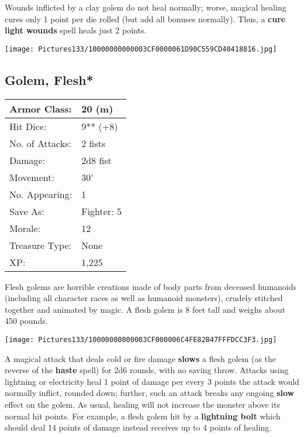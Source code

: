 \documentclass[a4paper,twoside,openany,10pt]{book}
\begin{document}
\begin{multicols}{2}
Wounds inflicted by a clay golem do not heal normally; worse, magical healing cures only 1 point per die rolled (but add all bonuses normally). Thus, a \textbf{cure light wounds }spell heals just 2 points.


\begin{center}
	\texttt{[image: Pictures133/10000000000003CF0000061D90C559CD40418816.jpg]}
\end{center}

\subsection*{Golem, Flesh*}\label{golem-flesh}

\begin{tabularx}{0.48\textwidth}{@{}lX@{}}
Armor Class: & 20 (m) \\\hline
Hit Dice: & 9** (+8) \\\hline
No. of Attacks: & 2 fists \\\hline
Damage: & 2d8 fist \\\hline
Movement: & 30' \\\hline
No. Appearing: & 1 \\\hline
Save As: & Fighter: 5 \\\hline
Morale: & 12 \\\hline
Treasure Type: & None \\\hline
XP: & 1,225 \\\hline
\end{tabularx}\medskip

Flesh golems are horrible creations made of body parts from deceased humanoids (including all character races as well as humanoid monsters), crudely stitched together and animated by magic. A flesh golem is 8 feet tall and weighs about 450 pounds.


\begin{center}
	\texttt{[image: Pictures133/10000000000003CF000006C4FE82B47FFFDCC3F3.jpg]}
\end{center}

A magical attack that deals cold or fire damage
\textbf{slows} a flesh golem (as the reverse of the \textbf{haste} spell) for 2d6 rounds, with no saving throw. Attacks using lightning or electricity heal 1 point of damage per every 3 points the attack would normally inflict, rounded down; further, such an attack breaks any ongoing \textbf{slow} effect on the golem. As usual, healing will not increase the monster above its normal hit points. For example, a flesh golem hit by a \textbf{lightning bolt} which should deal 14 points of damage instead receives up to 4 points of healing.


\end{multicols}
\end{document}
